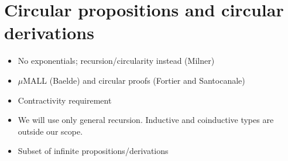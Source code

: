 \section{Circular propositions and circular derivations}

\begin{itemize}
\item No exponentials; recursion/circularity instead (Milner)
\item $\mu$MALL (Baelde) and circular proofs (Fortier and Santocanale)
\item Contractivity requirement
\item We will use only general recursion.
  Inductive and coinductive types are outside our scope.
\item Subset of infinite propositions/derivations
\end{itemize}









